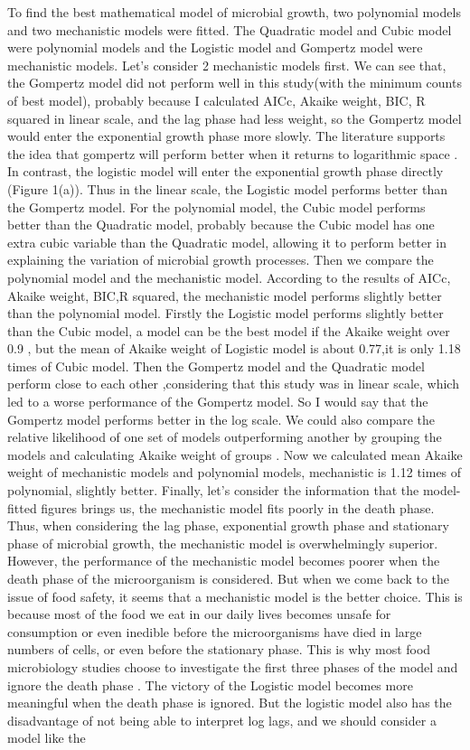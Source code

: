 \documentclass[11pt]{article}
\begin{document}
\begin{linenumbers}
    To find the best mathematical model of microbial growth, two polynomial models and two mechanistic models were fitted. The Quadratic model and Cubic model were polynomial models and the Logistic model and Gompertz model were mechanistic models. Let's consider 2 mechanistic models first. We can see that, the Gompertz model did not perform well in this study(with the minimum counts of best model), probably because I calculated AICc, Akaike weight, BIC, R squared in linear scale, and the lag phase had less weight, so the Gompertz model would enter the exponential growth phase more slowly. The literature supports the idea that gompertz will perform better when it returns to logarithmic space \cite{zwietering1990modeling}. In contrast, the logistic model will enter the exponential growth phase directly (Figure 1(a)). Thus in the linear scale, the Logistic model performs better than the Gompertz model. For the polynomial model, the Cubic model performs better than the Quadratic model, probably because the Cubic model has one extra cubic variable than the Quadratic model, allowing it to perform better in explaining the variation of microbial growth processes. Then we compare the polynomial model and the mechanistic model. According to the results of AICc, Akaike weight, BIC,R squared, the mechanistic model performs slightly better than the polynomial model. Firstly the Logistic model performs slightly better than the Cubic model, a model can be the best model if the Akaike weight over 0.9 \cite{johnson2004model}, but the mean of Akaike weight of Logistic model is about 0.77,it is only 1.18 times of Cubic model. Then the Gompertz model and the Quadratic model perform close to each other ,considering that this study was in linear scale, which led to a worse performance of the Gompertz model. So I would say that the Gompertz model performs better in the log scale. We could also compare the relative likelihood of one set of models outperforming another by grouping the models and calculating Akaike weight of groups \cite{wagenmakers2004aic}. Now we calculated mean Akaike weight of mechanistic models and polynomial models, mechanistic is 1.12 times of polynomial, slightly better. Finally, let's consider the information that the model-fitted figures brings us, the mechanistic model fits poorly in the death phase. Thus, when considering the lag phase, exponential growth phase and stationary phase of microbial growth, the mechanistic model is overwhelmingly superior. However, the performance of the mechanistic model becomes poorer when the death phase of the microorganism is considered. But when we come back to the issue of food safety, it seems that a mechanistic model is the better choice. This is because most of the food we eat in our daily lives becomes unsafe for consumption or even inedible before the microorganisms have died in large numbers of cells, or even before the stationary phase. This is why most food microbiology studies choose to investigate the first three phases of the model and ignore the death phase \cite{peleg2011microbial}. The victory of the Logistic model becomes more meaningful when the death phase is ignored. But the logistic model also has the disadvantage of not being able to interpret log lags, and we should consider a model like the 
\end{linenumbers}
\end{document}
